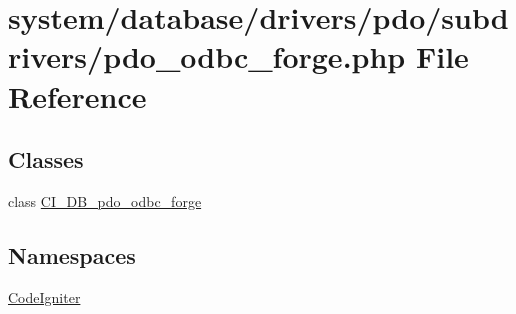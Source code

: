 \hypertarget{pdo__odbc__forge_8php}{}\section{system/database/drivers/pdo/subdrivers/pdo\+\_\+odbc\+\_\+forge.php File Reference}
\label{pdo__odbc__forge_8php}
\subsection*{Classes}
\begin{DoxyCompactItemize}
\item 
class \mbox{\hyperlink{class_c_i___d_b__pdo__odbc__forge}{C\+I\+\_\+\+D\+B\+\_\+pdo\+\_\+odbc\+\_\+forge}}
\end{DoxyCompactItemize}
\subsection*{Namespaces}
\begin{DoxyCompactItemize}
\item 
 \mbox{\hyperlink{namespace_code_igniter}{Code\+Igniter}}
\end{DoxyCompactItemize}
